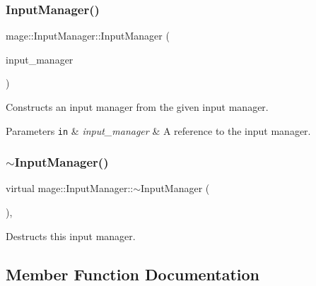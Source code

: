 \subsubsection{\texorpdfstring{Input\+Manager()}{InputManager()}\hspace{0.1cm}{\footnotesize\ttfamily [3/3]}}
{\footnotesize\ttfamily mage\+::\+Input\+Manager\+::\+Input\+Manager (\begin{DoxyParamCaption}\item[{\hyperlink{classmage_1_1_input_manager}{Input\+Manager} \&\&}]{input\+\_\+manager }\end{DoxyParamCaption})\hspace{0.3cm}{\ttfamily [default]}}

Constructs an input manager from the given input manager.


\begin{DoxyParams}[1]{Parameters}
\mbox{\tt in}  & {\em input\+\_\+manager} & A reference to the input manager. \\
\hline
\end{DoxyParams}
\hypertarget{classmage_1_1_input_manager_a6e6e612b3b2bacb4ee5d0fcfde35a275}{}\label{classmage_1_1_input_manager_a6e6e612b3b2bacb4ee5d0fcfde35a275} 
\subsubsection{\texorpdfstring{$\sim$\+Input\+Manager()}{~InputManager()}}
{\footnotesize\ttfamily virtual mage\+::\+Input\+Manager\+::$\sim$\+Input\+Manager (\begin{DoxyParamCaption}{ }\end{DoxyParamCaption})\hspace{0.3cm}{\ttfamily [virtual]}, {\ttfamily [default]}}

Destructs this input manager. 

\subsection{Member Function Documentation}
\hypertarget{classmage_1_1_input_manager_a5b72139e30d1f3da6cda50f2989c1350}{}\label{classmage_1_1_input_manager_a5b72139e30d1f3da6cda50f2989c1350} 
